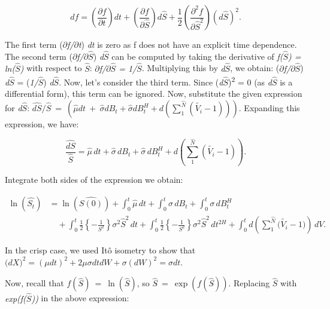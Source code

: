 \documentclass[12pt,a4paper]{report}
\numberwithin{equation}{section}
\begin{document}
\[
df = \left(\frac{\partial f}{\partial t}\right)dt
+ \left(\frac{\partial f}{\partial \hat{S}}\right)d\hat{S}
+ \frac{1}{2}\left(\frac{\partial^{2} f}{\partial \hat{S}^{2}}\right)\left(d\hat{S}\right)^{2}.
\]


The first term (\emph{$\partial$f/$\partial$t}) \emph{dt} is zero as f does not have an
explicit time dependence. The second term (\emph{$\partial$f/$\partial$$\hat{S}$}) \emph{d$\hat{S}$} can
be computed by taking the derivative of \emph{f($\hat{S}$) = ln($\hat{S}$)} with respect
to \emph{$\hat{S}$}: \emph{$\partial$f/$\partial$$\hat{S}$ = 1/$\hat{S}$}. Multiplying this by \emph{d$\hat{S}$}, we
obtain: (\emph{$\partial$f/$\partial$$\hat{S}$}) \emph{d$\hat{S}$} = (\emph{1/$\hat{S}$}) \emph{d$\hat{S}$}. Now, let's
consider the third term. Since (\emph{d$\hat{S}$})\textsuperscript{2} = 0 (as
\emph{d$\hat{S}$} is a differential form), this term can be ignored. Now,
substitute the given expression for \emph{d$\hat{S}$}:
\(\widehat{dS}/\widehat{S}\  = \ (\widehat{\mu}dt\  + \ \widehat{\sigma}dB_{t} + \widehat{\sigma}dB_{t}^{H} + d\left( \sum_{1}^{\widehat{N}}\left( \widetilde{V_{i}} - 1 \right) \right))\).
Expanding this expression, we have:

\[
\frac{\widehat{dS}}{\widehat{S}}
= \widehat{\mu}\,dt
+ \widehat{\sigma}\,dB_{t}
+ \widehat{\sigma}\,dB_{t}^{H}
+ d\left(\sum_{1}^{\widehat{N}}\left(\widetilde{V_{i}}-1\right)\right).
\]


Integrate both sides of the expression we obtain:

\[
\begin{aligned}
\ln(\widehat{S_t})
&= \ln(\widehat{S(0)}) + \int_{0}^{t}\widehat{\mu}\,dt
+ \int_{0}^{t}\sigma\,dB_t
+ \int_{0}^{t}\sigma\,dB_t^{H} \\
&\quad + \int_{0}^{t}\frac{1}{2}\left\{-\frac{1}{S^{2}}\right\}\sigma^{2}\widehat{S}^{2}\,dt
+ \int_{0}^{t}\frac{1}{2}\left\{-\frac{1}{S^{2}}\right\}\sigma^{2}\widehat{S}^{2}\,dt^{2H}
+ \int_{0}^{t} d\!\left(\sum_{1}^{\widehat{N}}\bigl(\widetilde{V_i}-1\bigr)\right)\,dV.
\end{aligned}
\]



In the crisp case, we used Itô isometry to show that
\(({dX)}^{2} = (\mu dt)^{2} + 2\mu\sigma dtdW + \sigma(dW)^{2} = \sigma dt\).

Now, recall that \(f(\widehat{S\hat{}})\  = \ \ln(\widehat{S\hat{}})\),
so \(\widehat{S\hat{}}\  = \ \exp(f(\widehat{S\hat{}}))\). Replacing
\(\widehat{S}\) with \emph{exp(f($\hat{S}$))} in the above expression:
\end{document}
